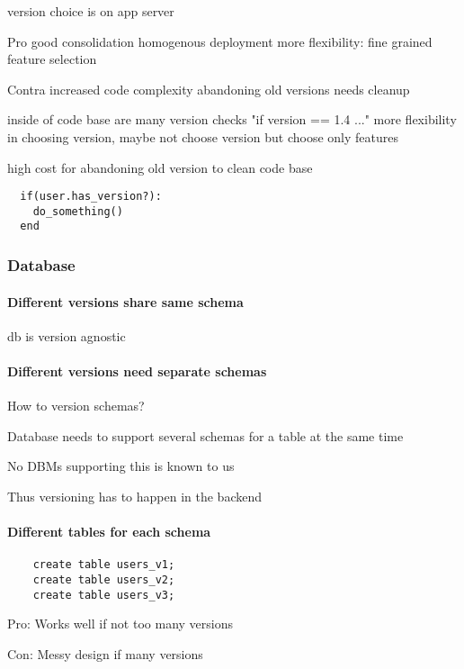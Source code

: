 version choice is on app server


Pro
good consolidation
homogenous deployment
more flexibility: fine grained feature selection

Contra
increased code complexity
abandoning old versions needs cleanup



inside of code base are many version checks "if version == 1.4 ..."
more flexibility in choosing version, maybe not choose version but choose only features

high cost for abandoning old version to clean code base

\lstset{language=Ruby, caption=code snippet, label=code}
\begin{lstlisting}
  if(user.has_version?):
    do_something()
  end
\end{lstlisting}

\subsubsection{Database}

\paragraph{Different versions share same schema}
db is version agnostic

\paragraph{Different versions need separate schemas}
How to version schemas?

  Database needs to support several schemas for a table at the same time

  No DBMs supporting this is known to us

  Thus versioning has to happen in the backend

  \paragraph{Different tables for each schema}
  \lstset{language=SQL, caption=sql, label=sql}
  \begin{lstlisting}
    create table users_v1;
    create table users_v2;
    create table users_v3;
  \end{lstlisting}

  Pro:
  Works well if not too many versions

  Con:
  Messy design if many versions


